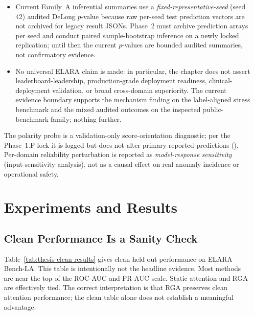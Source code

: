 \documentclass[11pt]{article}
\newcommand{\method}{RGA}
\newcommand{\benchmark}{ELARA-Bench-LA}
\begin{document}
\begin{itemize}
\begin{itemize}
                $\tau = 0.52$ and $\tau = 0.51$, observed $0.000$) but
                is not confirmed under primary bootstrap inference.
        \end{itemize}
  \item Current Family~A inferential summaries use a
        \emph{fixed-representative-seed} (seed 42) audited DeLong
        $p$-value because raw per-seed test prediction vectors are
        not archived for legacy result JSONs. Phase~2 must archive
        prediction arrays per seed and conduct paired sample-bootstrap
        inference on a newly locked replication; until then the
        current $p$-values are bounded audited summaries, not
        confirmatory evidence.
  \item No universal ELARA claim is made: in particular, the chapter
        does not assert leaderboard-leadership, production-grade
        deployment readiness, clinical-deployment validation, or
        broad cross-domain superiority. The current evidence
        boundary supports the mechanism finding on the label-aligned
        stress benchmark and the mixed audited outcomes on the
        inspected public-benchmark family; nothing further.
\end{itemize}

The polarity probe is a validation-only score-orientation
diagnostic; per the Phase~1.F lock it is logged but does not alter
primary reported predictions
().
Per-domain reliability perturbation is reported as
\emph{model-response sensitivity} (input-sensitivity analysis), not
as a causal effect on real anomaly incidence or operational safety.

\section{Experiments and Results}

\subsection{Clean Performance Is a Sanity Check}

Table~\ref{tab:thesis-clean-results} gives clean held-out performance on
\benchmark{}. This table is intentionally not the headline evidence. Most
methods are near the top of the ROC-AUC and PR-AUC scale. Static attention and
\method{} are effectively tied. The correct interpretation is that \method{}
preserves clean attention performance; the clean table alone does not establish
a meaningful advantage.
\end{document}
